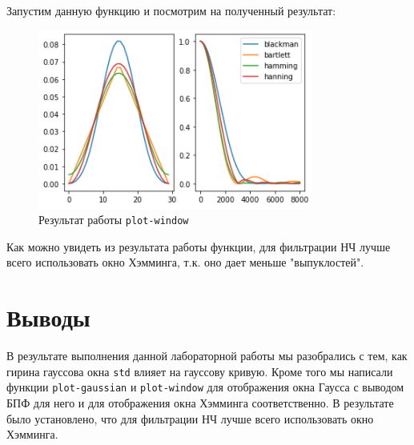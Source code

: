 \documentclass[a4paper]{article}
\begin{document}
            Запустим данную функцию и посмотрим на полученный результат:
            
            \begin{figure}[H]
                \centering
                \includegraphics[width=\textwidth]{ex_3_result.png}
                \caption{Результат работы \texttt{plot-window}}
                \label{fig:ex_3_result}
            \end{figure}
            
            Как можно увидеть из результата работы функции, для фильтрации НЧ лучше всего использовать окно Хэмминга, т.к. оно дает меньше "выпуклостей".
            
            
    \newpage
        \section{Выводы}
             В результате выполнения данной лабораторной работы мы разобрались с тем, как гирина гауссова окна \texttt{std} влияет на гауссову кривую. Кроме того мы написали функции \texttt{plot-gaussian} и \texttt{plot-window} для отображения окна Гаусса с выводом БПФ для него и для отображения окна Хэмминга соответственно. В результате было установлено, что для фильтрации НЧ лучше всего использовать окно Хэмминга.
            
\end{document}
